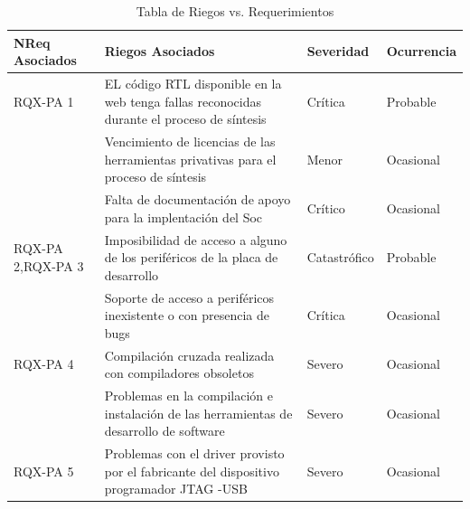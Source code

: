 		\begin{table}[h!]
		\centering
		\begin{tabular}{ p{2.5cm} p{9cm} p{2cm} p{2cm} }
		\hline 
		\rowcolor[gray]{0.8} N\textordmasculine Req Asociados& Riegos Asociados & Severidad  & Ocurrencia \\
		\hline
		RQX-PA 1& EL código RTL disponible en la web tenga fallas reconocidas durante el proceso de síntesis & Crítica       & Probable \\
		\hline
				& Vencimiento de licencias de las herramientas privativas para el proceso de síntesis  & Menor  & Ocasional\\	 
		\hline
				& Falta de documentación de apoyo para la implentación
del Soc & Crítico & Ocasional\\	 
		\hline

		RQX-PA 2,RQX-PA 3 & Imposibilidad de acceso a alguno de los periféricos de la placa de desarrollo &  Catastrófico  & Probable\\
		\hline
		& Soporte de acceso a periféricos inexistente o con presencia
de bugs & Crítica  & Ocasional\\	 
		\hline
		RQX-PA 4& Compilación cruzada realizada con compiladores obsoletos & Severo  &  Ocasional\\ 
		\hline
		&Problemas en la compilación e instalación de las herramientas de desarrollo de software  & Severo  &  Ocasional\\ 
		\hline
		RQX-PA 5& Problemas con el driver provisto por el fabricante del  dispositivo programador JTAG -USB & Severo&  Ocasional\\
		\hline
		\end{tabular}
		\caption{Tabla de Riegos vs. Requerimientos}
		\end{table}



